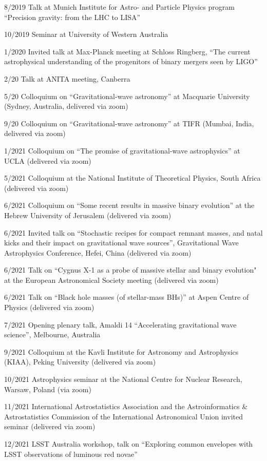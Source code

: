 \documentclass[margin,line]{res}
\begin{document}
\begin{resume}
8/2019 Talk at Munich Institute for Astro- and Particle Physics program ``Precision gravity: from the LHC to LISA''

10/2019 Seminar at University of Western Australia

1/2020 Invited talk at Max-Planck meeting at Schloss Ringberg, ``The current astrophysical understanding of the progenitors of binary mergers seen by LIGO''

2/20 Talk at ANITA meeting, Canberra

5/20 Colloquium on ``Gravitational-wave astronomy'' at Macquarie University (Sydney, Australia, delivered via zoom)

9/20 Colloquium on  ``Gravitational-wave astronomy'' at TIFR (Mumbai, India, delivered via zoom)

1/2021 Colloquium on ``The promise of gravitational-wave astrophysics'' at UCLA (delivered via zoom)

5/2021 Colloquium at the National Institute of Theoretical Physics, South Africa (delivered via zoom)

6/2021 Colloquium on ``Some recent results in massive binary evolution''  at the Hebrew University of Jerusalem (delivered via zoom)

6/2021 Invited talk on ``Stochastic recipes for compact remnant masses, and natal kicks and their impact on gravitational wave sources'', Gravitational Wave Astrophysics Conference, Hefei, China  (delivered via zoom)

6/2021 Talk on ``Cygnus X-1 as a probe of massive stellar and binary evolution" at the European Astronomical Society meeting (delivered via zoom)

6/2021 Talk on ``Black hole masses (of stellar-mass BHs)'' at Aspen Centre of Physics (delivered via zoom)

7/2021 Opening plenary talk, Amaldi 14 ``Accelerating gravitational wave science'', Melbourne, Australia

9/2021 Colloquium at the Kavli Institute for Astronomy and Astrophysics (KIAA), Peking University (delivered via zoom)

10/2021 Astrophysics seminar at the National Centre for Nuclear Research, Warsaw, Poland (via zoom)

11/2021 International Astrostatistics Association and the Astroinformatics \& Astrostatistics Commission of the International Astronomical Union invited seminar (delivered via zoom)

12/2021 LSST Australia workshop, talk on ``Exploring common envelopes with LSST observations of luminous red novae''


\end{resume}
\end{document}
